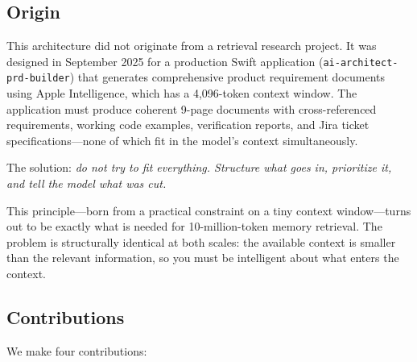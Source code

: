 \documentclass[11pt]{article}
\begin{document}
\subsection{Origin}
\label{sec:origin}

This architecture did not originate from a retrieval research project.
It was designed in September 2025 for a production Swift application
(\texttt{ai-architect-prd-builder}) that generates comprehensive
product requirement documents using Apple Intelligence, which has a
4,096-token context window.  The application must produce coherent
9-page documents with cross-referenced requirements, working code
examples, verification reports, and Jira ticket specifications---none
of which fit in the model's context simultaneously.

The solution: \emph{do not try to fit everything.  Structure what
goes in, prioritize it, and tell the model what was cut.}

This principle---born from a practical constraint on a tiny context
window---turns out to be exactly what is needed for 10-million-token
memory retrieval.  The problem is structurally identical at both
scales: the available context is smaller than the relevant information,
so you must be intelligent about what enters the context.

\subsection{Contributions}
\label{sec:contributions}

We make four contributions:
\end{document}
